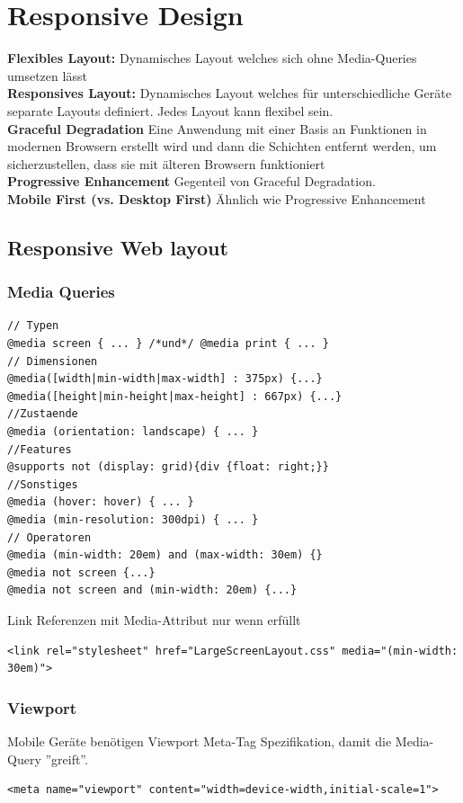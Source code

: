 
\section{Responsive Design}

\textbf{Flexibles Layout:} Dynamisches Layout welches sich ohne Media-Queries umsetzen lässt\\
\textbf{Responsives Layout:} Dynamisches Layout welches für unterschiedliche Geräte separate Layouts definiert. Jedes Layout kann flexibel sein.\\
\textbf{Graceful Degradation} Eine Anwendung mit einer Basis an Funktionen in modernen Browsern erstellt wird und dann die Schichten entfernt werden, um sicherzustellen, dass sie mit älteren Browsern funktioniert\\
\textbf{Progressive Enhancement} Gegenteil von Graceful Degradation.\\
\textbf{Mobile First (vs. Desktop First)} Ähnlich wie Progressive Enhancement


\subsection{Responsive Web layout}
\subsubsection{Media Queries}
\begin{lstlisting}
// Typen
@media screen { ... } /*und*/ @media print { ... }
// Dimensionen
@media([width|min-width|max-width] : 375px) {...}
@media([height|min-height|max-height] : 667px) {...}
//Zustaende
@media (orientation: landscape) { ... }
//Features
@supports not (display: grid){div {float: right;}}
//Sonstiges
@media (hover: hover) { ... }
@media (min-resolution: 300dpi) { ... }
// Operatoren
@media (min-width: 20em) and (max-width: 30em) {}
@media not screen {...}
@media not screen and (min-width: 20em) {...}
\end{lstlisting}
Link Referenzen mit Media-Attribut nur wenn erfüllt
\begin{lstlisting}
<link rel="stylesheet" href="LargeScreenLayout.css" media="(min-width: 30em)">
\end{lstlisting}

\subsubsection{Viewport}
Mobile Geräte benötigen Viewport Meta-Tag Spezifikation, damit die Media-Query ''greift''.
\begin{lstlisting}
<meta name="viewport" content="width=device-width,initial-scale=1">
\end{lstlisting}


